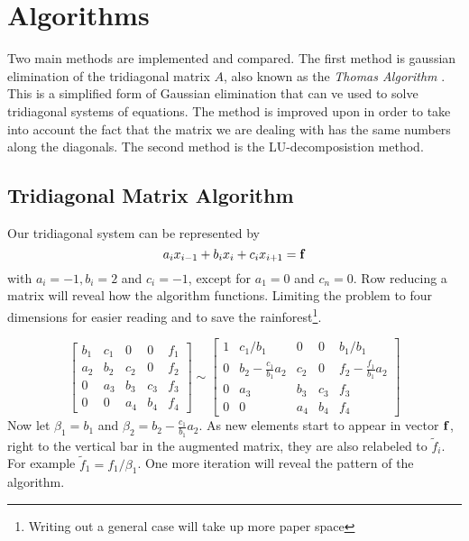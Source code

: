 \documentclass[10pt, a4paper]{amsart}
\begin{document}
\section{Algorithms}
Two main methods are implemented and compared. The first method is
gaussian elimination of the tridiagonal matrix $A$, also known as the
\emph{Thomas Algorithm} \cite{thomasalgo}. This is a simplified form of Gaussian
elimination that can ve used to solve tridiagonal systems of
equations. The method is improved upon in order to take into account
the fact that the matrix we are dealing with has the same numbers
along the diagonals. The second method is the LU-decomposistion
method.

\subsection{Tridiagonal Matrix Algorithm}
Our tridiagonal system can be represented by 
\begin{equation}
a_ix_{i-1} + b_ix_i + c_ix_{i+1} = \vb{f}
\end{equation}
with $a_i=-1,b_i=2$ and $c_i=-1$, except for $a_1=0$ and $c_n=0$. Row
reducing a matrix will reveal how the algorithm functions. Limiting
the problem to four dimensions for easier reading and to save the
rainforest\footnote{Writing out a general case will take up more paper
space}.

\begin{equation}
\left[
\begin{array}{cccc|c}
b_1 & c_1 & 0 & 0 & f_1 \\
a_2 & b_2 & c_2 & 0  & f_2 \\
0 & a_3 & b_3 & c_3 & f_3 \\
0 & 0 & a_4 & b_4 & f_4
\end{array}
\right] \sim
\left[
\begin{array}{cccc|c}
1 & c_1/b_1 & 0 & 0 & b_1/b_1 \\
0 & b_2-\frac{c_1}{b_1}a_2 & c_2 & 0  & f_2-\frac{f_1}{b_1}a_2 \\
0 & a_3 & b_3 & c_3 & f_3 \\
0 & 0 & a_4 & b_4 & f_4
\end{array}
\right]
\end{equation}
Now let $\beta_1=b_1$ and $\beta_2=b_2-\frac{c_1}{b_1}a_2$. As new
elements start to appear in vector $\vb{f}$, right to the vertical bar
in the augmented matrix, they are also relabeled to $\tilde{f}_i$. For
example $\tilde{f}_1=f_1/\beta_1$. One more iteration will reveal the
pattern of the algorithm.
\end{document}
